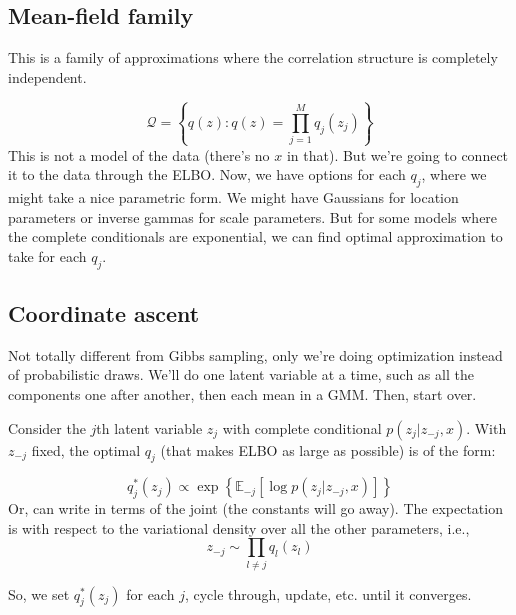 \documentclass{article}
\newcommand{\mycite}[1]{\item[\cite{#1}] ~\\ \fullcite{#1} \\ ~ \\}
\begin{document}
\subsection{Mean-field family}
This is a family of approximations where the correlation structure is completely independent.

\begin{equation*}
  \mathcal{Q}=\left\{q(z) : q(z)=\prod_{j=1}^M q_j(z_j)\right\}
\end{equation*}
This is not a model of the data (there's no $x$ in that). But we're going to connect it to the data
through the ELBO. Now, we have options for each $q_j$, where we might take a nice parametric form. We might have Gaussians for location parameters
or inverse gammas for scale parameters. But for some models where the complete conditionals are exponential, we can find optimal approximation to take for each $q_j$.

\subsection{Coordinate ascent}
Not totally different from Gibbs sampling, only we're doing optimization instead of probabilistic draws. We'll do
one latent variable at a time, such as all the components one after another, then each mean in a GMM. Then, start over.

Consider the $j$th latent variable $z_j$ with complete conditional $p(z_j|z_{-j}, x)$. With $z_{-j}$ fixed,
the optimal $q_j$ (that makes ELBO as large as possible) is of the form:

\begin{equation}
  q_j^*(z_j)\propto \exp\left\{ \mathbb{E}_{-j}\left[ \log p(z_j | z_{-j}, x)\right] \right\}
\end{equation}
Or, can write in terms of the joint (the constants will go away). The expectation is with
respect to the variational density over all the other parameters, i.e.,
\begin{equation*}
  z_{-j}\sim \prod_{l\neq j} q_l(z_l)
\end{equation*}

So, we set $q_j^*(z_j)$ for each $j$, cycle through, update, etc. until it converges.



\end{document}
